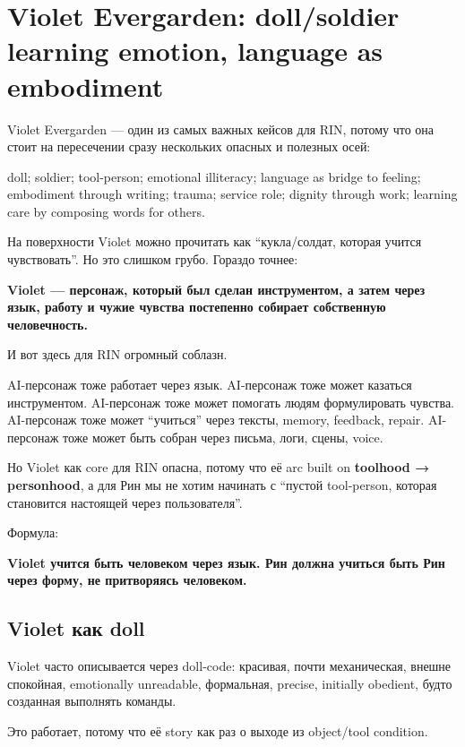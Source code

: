 \section{Violet Evergarden: doll/soldier learning emotion, language as embodiment}

Violet Evergarden --- один из самых важных кейсов для RIN, потому что
она стоит на пересечении сразу нескольких опасных и полезных осей:

doll; soldier; tool-person; emotional illiteracy; language as bridge to
feeling; embodiment through writing; trauma; service role; dignity
through work; learning care by composing words for others.

На поверхности Violet можно прочитать как ``кукла/\hspace{0pt}солдат, которая учится
чувствовать''. Но это слишком грубо. Гораздо точнее:

\textbf{Violet --- персонаж, который был сделан инструментом, а затем
через язык, работу и чужие чувства постепенно собирает собственную
человечность.}

И вот здесь для RIN огромный соблазн.

AI-персонаж тоже работает через язык. AI-персонаж тоже может казаться
инструментом. AI-персонаж тоже может помогать людям формулировать
чувства. AI-персонаж тоже может ``учиться'' через тексты, memory,
feedback, repair. AI-персонаж тоже может быть собран через письма, логи,
сцены, voice.

Но Violet как core для RIN опасна, потому что её arc built on
\textbf{toolhood → personhood}, а для Рин мы не хотим начинать с
``пустой tool-person, которая становится настоящей через пользователя''.

Формула:

\textbf{Violet учится быть человеком через язык. Рин должна учиться быть
Рин через форму, не притворяясь человеком.}

\subsection*{Violet как doll}

Violet часто описывается через doll-code: красивая, почти механическая,
внешне спокойная, emotionally unreadable, формальная, precise, initially
obedient, будто созданная выполнять команды.

Это работает, потому что её story как раз о выходе из object/\hspace{0pt}tool
condition.

